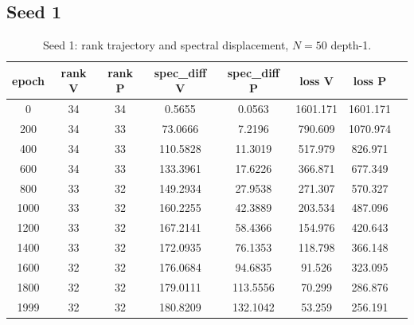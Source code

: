 \subsection*{Seed 1}
\begin{table}[H]
\centering
\caption{Seed 1: rank trajectory and spectral displacement, $N = 50$ depth-1.}
\label{tab:ranspec-s1}
\begin{tabular}{c c c c c c c c}
\toprule
epoch & rank V & rank P & spec\_diff V & spec\_diff P & loss V & loss P \\
\midrule
0 & 34 & 34 & 0.5655 & 0.0563 & 1601.171 & 1601.171 \\
200 & 34 & 33 & 73.0666 & 7.2196 & 790.609 & 1070.974 \\
400 & 34 & 33 & 110.5828 & 11.3019 & 517.979 & 826.971 \\
600 & 34 & 33 & 133.3961 & 17.6226 & 366.871 & 677.349 \\
800 & 33 & 32 & 149.2934 & 27.9538 & 271.307 & 570.327 \\
1000 & 33 & 32 & 160.2255 & 42.3889 & 203.534 & 487.096 \\
1200 & 33 & 32 & 167.2141 & 58.4366 & 154.976 & 420.643 \\
1400 & 33 & 32 & 172.0935 & 76.1353 & 118.798 & 366.148 \\
1600 & 32 & 32 & 176.0684 & 94.6835 & 91.526 & 323.095 \\
1800 & 32 & 32 & 179.0111 & 113.5556 & 70.299 & 286.876 \\
1999 & 32 & 32 & 180.8209 & 132.1042 & 53.259 & 256.191 \\
\bottomrule
\end{tabular}
\end{table}

